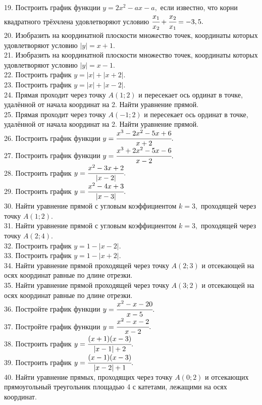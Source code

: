 19. Построить график функции $y=2x^2-ax-a,$ если известно, что корни квадратного трёхчлена удовлетворяют условию $\cfrac{x_1}{x_2}+\cfrac{x_2}{x_1}=-3,5.$\\
20. Изобразить на координатной плоскости множество точек, координаты которых удовлетворяют условию $|y|=x+1.$\\
21. Изобразить на координатной плоскости множество точек, координаты которых удовлетворяют условию $|y|=x-1.$\\
22. Построить график $y=|x|+|x+2|.$\\
23. Построить график $y=|x|+|x-2|.$\\
24. Прямая проходит через точку $A(1;2)$ и пересекает ось ординат в точке, удалённой от начала координат на 2. Найти уравнение прямой.\\
25. Прямая проходит через точку $A(-1;2)$ и пересекает ось ординат в точке, удалённой от начала координат на 2. Найти уравнение прямой.\\
26. Построить график функции $y=\cfrac{x^3-2x^2-5x+6}{x+2}.$\\
27. Построить график функции $y=\cfrac{x^3+2x^2-5x-6}{x-2}.$\\
28. Построить график $y=\cfrac{x^2-3x+2}{|x-2|}.$\\
29. Построить график $y=\cfrac{x^2-4x+3}{|x-3|}.$\\
30. Найти уравнение прямой с угловым коэффициентом $k=3,$ проходящей через точку $A(1;2).$\\
31. Найти уравнение прямой с угловым коэффициентом $k=3,$ проходящей через точку $A(2;4).$\\
32. Построить график $y=1-|x-2|.$\\
33. Построить график $y=1-|x+2|.$\\
34. Найти уравнение прямой проходящей через точку $A(2;3)$ и отсекающей на осях координат равные по длине отрезки.\\
35. Найти уравнение прямой проходящей через точку $A(3;2)$ и отсекающей на осях координат равные по длине отрезки.\\
36. Постройте график функции $y=\cfrac{x^2-x-20}{x-5}.$\\
37. Постройте график функции $y=\cfrac{x^2-x-2}{x-2}.$\\
38. Построить график $y=\cfrac{(x+1)(x-3)}{|x-1|+2}.$\\
39. Построить график $y=\cfrac{(x-1)(x-3)}{|x-2|+1}.$\\
40. Найти уравнение прямых, проходящих через точку $A(0;2)$ и отсекающих прямоугольный треугольник площадью 4 с катетами, лежащими на осях координат.\\

